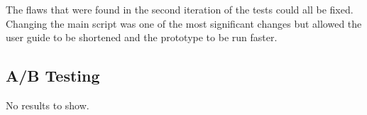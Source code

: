 The flaws that were found in the second iteration of the tests could all be fixed. Changing the main script was one of the most significant changes but allowed the user guide to be shortened and the prototype to be run faster.


\subsection{A/B Testing}%
\label{sub:A/B Testing}
No results to show. 


